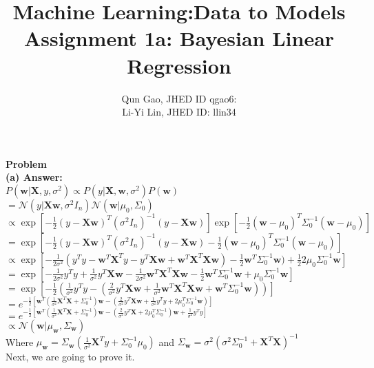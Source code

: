 \documentclass{article}
\title{Machine Learning:Data to Models \\Assignment 1a: Bayesian Linear Regression}
\author{Qun Gao, JHED ID qgao6: \\Li-Yi Lin, JHED ID: llin34}
\date{}
\begin{document}
\maketitle

\noindent
\textbf{Problem}\\
\textbf{(a) Answer:}\\
$P(\textbf{w}|\textbf{X}, y, \sigma^2) \propto P(y|\textbf{X}, \textbf{w}, \sigma^2)P(\textbf{w})$\\  
$=\mathcal{N}(y|\textbf{X}\textbf{w}, \sigma^2I_n)\mathcal{N}(\textbf{w}|\mu_0, \Sigma_0)$\\
$\propto \exp[-\frac{1}{2}(y - \textbf{X}\textbf{w})^T(\sigma^2I_n)^{-1}(y - \textbf{X}\textbf{w})]\exp[-\frac{1}{2}(\textbf{w} - \mu_0)^T\Sigma_0^{-1}(\textbf{w} - \mu_0)]$\\
$=\exp[-\frac{1}{2}(y - \textbf{X}\textbf{w})^T(\sigma^2I_n)^{-1}(y - \textbf{X}\textbf{w})-\frac{1}{2}(\textbf{w} - \mu_0)^T\Sigma_0^{-1}(\textbf{w} - \mu_0)]$\\
$\propto \exp[-\frac{1}{2\sigma^2}(y^Ty - \textbf{w}^T\textbf{X}^Ty - y^T\textbf{X}\textbf{w} + \textbf{w}^T\textbf{X}^T\textbf{X}\textbf{w}) - \frac{1}{2}\textbf{w}^T\Sigma_0^{-1}\textbf{w}) + \frac{1}{2}2\mu_0\Sigma_0^{-1}\textbf{w}]$\\
$=\exp[-\frac{1}{2\sigma^2}y^Ty + \frac{1}{\sigma^2}y^T\textbf{X}\textbf{w} - \frac{1}{2\sigma^2}\textbf{w}^T\textbf{X}^T\textbf{X}\textbf{w} - \frac{1}{2}\textbf{w}^T\Sigma_0^{-1}\textbf{w} + \mu_0\Sigma_0^{-1}\textbf{w}]$\\
$=\exp[-\frac{1}{2}(\frac{1}{\sigma^2}y^Ty - (\frac{2}{\sigma^2}y^T\textbf{X}\textbf{w} + \frac{1}{\sigma^2}\textbf{w}^T\textbf{X}^T\textbf{X}\textbf{w} + \textbf{w}^T\Sigma_0^{-1}\textbf{w}))]$\\
$=e^{-\frac{1}{2}[\textbf{w}^T(\frac{1}{\sigma^2}\textbf{X}^T\textbf{X} + \Sigma_0^{-1})\textbf{w} -(\frac{2}{\sigma^2}y^T\textbf{X}\textbf{w} + \frac{1}{\sigma^2}y^Ty + 2\mu_0^T\Sigma_0^{-1}\textbf{w})]}$\\
$=e^{-\frac{1}{2}[\textbf{w}^T(\frac{1}{\sigma^2}\textbf{X}^T\textbf{X} + \Sigma_0^{-1})\textbf{w} - (\frac{2}{\sigma^2}y^T\textbf{X} + 2\mu_0^T\Sigma_0^{-1})\textbf{w} + \frac{1}{\sigma^2}y^Ty]}$\\
\noindent
$\propto \mathcal{N}(\textbf{w}|\mu_\textbf{w}, \Sigma_\textbf{w})$\\
Where $\mu_\textbf{w} = \Sigma_\textbf{w}(\frac{1}{\sigma^2}\textbf{X}^Ty + \Sigma_0^{-1}\mu_0)$ and $\Sigma_\textbf{w} = \sigma^2 (\sigma^2 \Sigma_0^{-1} + \textbf{X}^T\textbf{X})^{-1}$\\
Next, we are going to prove it.\\
\end{document}
